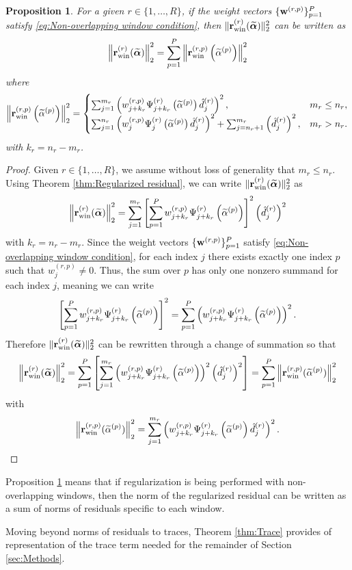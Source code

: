 \documentclass[12pt]{article}
\newtheorem{proposition}{Proposition}[section]
\begin{document}
\begin{proposition}
\label{prop:Non-overlapping windows}
For a given $r \in \{1,\ldots,R\}$, if the weight vectors $\{\mathbf{w}^{(r,p)}\}_{p=1}^{P}$ satisfy \eqref{eq:Non-overlapping window condition}, then $\|\mathbf{r}_{\text{win}}^{(r)}(\widetilde{\bm{\alpha}})\|_2^2$ can be written as
\[\left\|\mathbf{r}_{\text{win}}^{(r)}(\widetilde{\bm{\alpha}})\right\|_2^2 = \sum_{p=1}^{P} \left\|\mathbf{r}_{\text{win}}^{(r,p)}\left(\widetilde{\alpha}^{(p)}\right)\right\|_2^2\]
where
\[\left\|\mathbf{r}_{\text{win}}^{(r,p)}\left(\widetilde{\alpha}^{(p)}\right)\right\|_2^2 = \begin{cases} \sum_{j=1}^{m_r} \left(w_{j+k_r}^{(r,p)}\Psi_{j+k_r}^{(r)}\left(\widetilde{\alpha}^{(p)}\right) \hat{d}_j^{(r)}\right)^2, & m_r \leq n_r, \\
\sum_{j=1}^{n_r} \left(w_{j}^{(r,p)}\Psi_{j}^{(r)}\left(\widetilde{\alpha}^{(p)}\right) \hat{d}_j^{(r)}\right)^2 + \sum_{j = n_r + 1}^{m_r} \left(\hat{d}_j^{(r)}\right)^2, & m_r > n_r.
\end{cases}\]
with $k_r = n_r - m_r$.
\end{proposition}
\begin{proof}
Given $r \in \{1,\ldots,R\}$, we assume without loss of generality that $m_r \leq n_r$. Using Theorem \ref{thm:Regularized residual}, we can write $\|\mathbf{r}_{\text{win}}^{(r)}(\widetilde{\bm{\alpha}})\|_2^2$ as
\[\left\|\mathbf{r}_{\text{win}}^{(r)}(\widetilde{\bm{\alpha}})\right\|_2^2 = \sum_{j=1}^{m_r} \left[\sum_{p=1}^{P} w_{j+k_r}^{(r,p)}\Psi_{j+k_r}^{(r)}\left(\widetilde{\alpha}^{(p)}\right)\right]^2 \left(\hat{d}_j^{(r)}\right)^2\]
with $k_r = n_r - m_r$. Since the weight vectors $\{\mathbf{w}^{(r,p)}\}_{p=1}^{P}$ satisfy \eqref{eq:Non-overlapping window condition}, for each index $j$ there exists exactly one index $p$ such that $w^{(r,p)}_j \neq 0$. Thus, the sum over $p$ has only one nonzero summand for each index $j$, meaning we can write
\[\left[\sum_{p=1}^{P} w_{j + k_r}^{(r,p)} \Psi_{j + k_r}^{(r)}\left(\widetilde{\alpha}^{(p)}\right) \right]^2 = \sum_{p=1}^{P} \left(w_{j + k_r}^{(r,p)} \Psi_{j + k_r}^{(r)}\left(\widetilde{\alpha}^{(p)}\right)\right)^2.\]
Therefore $\|\mathbf{r}_{\text{win}}^{(r)}(\widetilde{\bm{\alpha}})\|_2^2$ can be rewritten through a change of summation so that
\[\left\|\mathbf{r}_{\text{win}}^{(r)}(\widetilde{\bm{\alpha}})\right\|_2^2 = \sum_{p=1}^{P} \left[ \sum_{j=1}^{m_r} \left( w_{j + k_r}^{(r,p)} \Psi_{j + k_r}^{(r)}\left(\widetilde{\alpha}^{(p)}\right)\right)^2 \left(\hat{d}_j^{(r)}\right)^2\right] = \sum_{p=1}^{P} \left\|\mathbf{r}_{\text{win}}^{(r,p)}(\widetilde{\alpha}^{(p)})\right\|_2^2\]
with
\[\left\|\mathbf{r}_{\text{win}}^{(r,p)}(\widetilde{\alpha}^{(p)})\right\|_2^2 = \sum_{j=1}^{m_r} \left(w_{j + k_r}^{(r,p)} \Psi_{j + k_r}^{(r)}\left(\widetilde{\alpha}^{(p)}\right)\hat{d}_j^{(r)}\right)^2.\]
\end{proof}
\noindent Proposition \ref{prop:Non-overlapping windows} means that if regularization is being performed with non-overlapping windows, then the norm of the regularized residual can be written as a sum of norms of residuals specific to each window. \par
Moving beyond norms of residuals to traces, Theorem \ref{thm:Trace} provides of representation of the trace term needed for the remainder of Section \ref{sec:Methods}.
\end{document}
